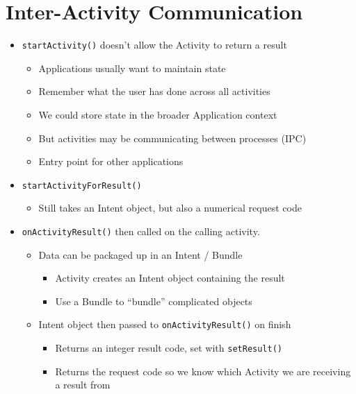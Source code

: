 \documentclass{article}
\begin{document}
\section{Inter-Activity	Communication}

\begin{itemize}
  \item \texttt{startActivity()} doesn’t allow the Activity to return a result
  \begin{itemize}
    \item Applications usually want to maintain state
    \item Remember what the user has done across all activities
    \item We could store state in the broader Application context
    \item But activities may be communicating between processes (IPC)
    \item Entry point for other applications
  \end{itemize}
  \item \texttt{startActivityForResult()}
  \begin{itemize}
    \item Still takes an Intent object, but also a numerical request code
  \end{itemize}
  \item \texttt{onActivityResult()} then called on the calling activity.
  \begin{itemize}
    \item Data can be packaged up in an Intent / Bundle
    \begin{itemize}
      \item Activity creates an Intent object containing the result
      \item Use a Bundle to “bundle” complicated objects
    \end{itemize}
     \item Intent object then passed to \texttt{onActivityResult()} on finish
     \begin{itemize}
       \item Returns an integer result code, set with \texttt{setResult()}
       \item Returns the request code so we know which Activity we are receiving a result from
     \end{itemize}
  \end{itemize}
\end{itemize}
\end{document}

